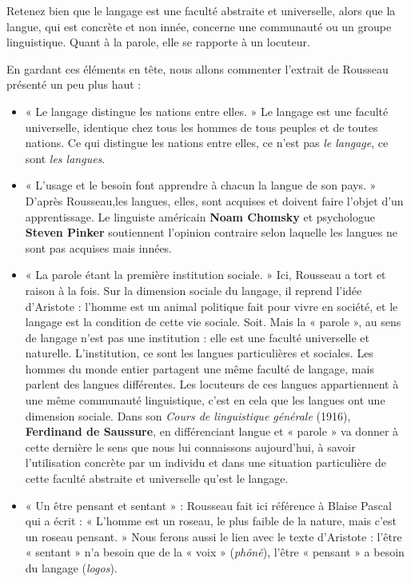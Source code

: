 Retenez bien que le langage est une faculté abstraite et universelle, alors que la langue, qui est concrète et non innée, concerne une communauté ou un groupe linguistique. Quant à la parole, elle se rapporte à un locuteur.

En gardant ces éléments en tête, nous allons commenter l’extrait de Rousseau présenté un peu plus haut :
\begin{itemize}
\item « Le langage distingue les nations entre elles. » Le langage est une faculté universelle, identique chez tous les hommes de tous peuples et de toutes nations. Ce qui distingue les nations entre elles, ce n’est pas \textit{le langage}, ce sont \textit{les langues}.
\item « L’usage et le besoin font apprendre à chacun la langue de son pays. » D’après Rousseau,les langues, elles, sont acquises et doivent faire l’objet d’un apprentissage. Le linguiste américain \textbf{Noam Chomsky} et psychologue \textbf{Steven Pinker} soutiennent l’opinion contraire selon laquelle les langues ne sont pas acquises mais innées.
\item « La parole étant la première institution sociale. » Ici, Rousseau a tort et raison à la fois. Sur la dimension sociale du langage, il reprend l’idée d’Aristote : l’homme est un animal politique fait pour vivre en société, et le langage est la condition de cette vie sociale. Soit. Mais la « parole », au sens de langage n’est pas une institution : elle est une faculté universelle et naturelle. L’institution, ce sont les langues particulières et sociales. Les hommes du monde entier partagent une même faculté de langage, mais parlent des langues différentes. Les locuteurs de ces langues appartiennent à une même communauté linguistique, c’est en cela que les langues ont une dimension sociale. Dans son \textit{Cours de linguistique générale} (1916), \textbf{Ferdinand de Saussure}, en différenciant langue et « parole » va donner à cette dernière le sens que nous lui connaissons aujourd’hui, à savoir l’utilisation concrète par un individu et dans une situation particulière de cette faculté abstraite et universelle qu’est le langage.
\item « Un être pensant et sentant » : Rousseau fait ici référence à Blaise Pascal qui a écrit : « L’homme est un roseau, le plus faible de la nature, mais c’est un roseau pensant. » Nous ferons aussi le lien avec le texte d’Aristote : l’être « sentant » n’a besoin que de la « voix » (\textit{phônê}), l’être « pensant » a besoin du langage (\textit{logos}).
\end{itemize}
